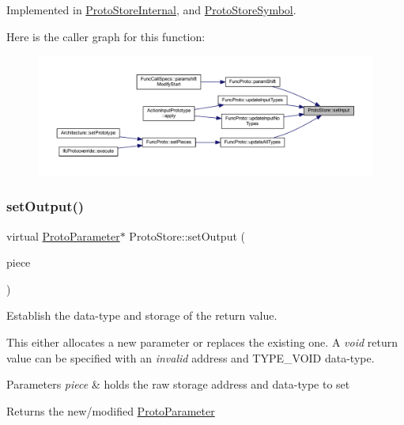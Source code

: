Implemented in \mbox{\hyperlink{class_proto_store_internal_a37baf5313582d2748bc012b95a651076}{Proto\+Store\+Internal}}, and \mbox{\hyperlink{class_proto_store_symbol_af9e24d39271ea90fc074010e4b24a2b1}{Proto\+Store\+Symbol}}.

Here is the caller graph for this function\+:
\nopagebreak
\begin{figure}[H]
\begin{center}
\leavevmode
\includegraphics[width=350pt]{class_proto_store_af24924b3d08fedff7e55788f2b7a0043_icgraph}
\end{center}
\end{figure}
\mbox{\label{class_proto_store_a51a4d28fac8dc3ba5037190ed0cc0edc}} 
\subsubsection{\texorpdfstring{setOutput()}{setOutput()}}
{\footnotesize\ttfamily virtual \mbox{\hyperlink{class_proto_parameter}{Proto\+Parameter}}$\ast$ Proto\+Store\+::set\+Output (\begin{DoxyParamCaption}\item[{const \mbox{\hyperlink{struct_parameter_pieces}{Parameter\+Pieces}} \&}]{piece }\end{DoxyParamCaption})\hspace{0.3cm}{\ttfamily [pure virtual]}}



Establish the data-\/type and storage of the return value. 

This either allocates a new parameter or replaces the existing one. A {\itshape void} return value can be specified with an {\itshape invalid} address and T\+Y\+P\+E\+\_\+\+V\+O\+ID data-\/type. 
\begin{DoxyParams}{Parameters}
{\em piece} & holds the raw storage address and data-\/type to set \\
\hline
\end{DoxyParams}
\begin{DoxyReturn}{Returns}
the new/modified \mbox{\hyperlink{class_proto_parameter}{Proto\+Parameter}} 
\end{DoxyReturn}


